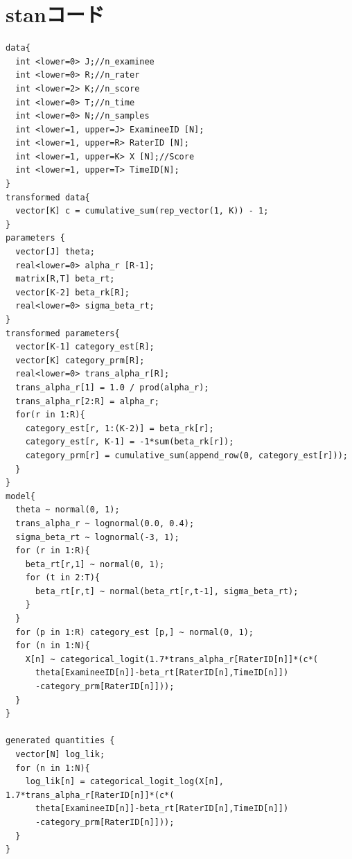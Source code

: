 \documentclass[a4paper,11pt,oneside,openany]{jsbook}
\begin{document}
\chapter{stanコード}
\begin{lstlisting}[basicstyle=\ttfamily\footnotesize, frame=single]
data{
  int <lower=0> J;//n_examinee
  int <lower=0> R;//n_rater
  int <lower=2> K;//n_score
  int <lower=0> T;//n_time
  int <lower=0> N;//n_samples
  int <lower=1, upper=J> ExamineeID [N];
  int <lower=1, upper=R> RaterID [N];
  int <lower=1, upper=K> X [N];//Score
  int <lower=1, upper=T> TimeID[N];
}
transformed data{
  vector[K] c = cumulative_sum(rep_vector(1, K)) - 1;
}
parameters {
  vector[J] theta;
  real<lower=0> alpha_r [R-1];
  matrix[R,T] beta_rt;
  vector[K-2] beta_rk[R];
  real<lower=0> sigma_beta_rt;
}
transformed parameters{
  vector[K-1] category_est[R];
  vector[K] category_prm[R];
  real<lower=0> trans_alpha_r[R];
  trans_alpha_r[1] = 1.0 / prod(alpha_r);
  trans_alpha_r[2:R] = alpha_r;
  for(r in 1:R){
    category_est[r, 1:(K-2)] = beta_rk[r];
    category_est[r, K-1] = -1*sum(beta_rk[r]);
    category_prm[r] = cumulative_sum(append_row(0, category_est[r]));
  }
}
model{
  theta ~ normal(0, 1);
  trans_alpha_r ~ lognormal(0.0, 0.4);
  sigma_beta_rt ~ lognormal(-3, 1);
  for (r in 1:R){
    beta_rt[r,1] ~ normal(0, 1);
    for (t in 2:T){
      beta_rt[r,t] ~ normal(beta_rt[r,t-1], sigma_beta_rt);
    }
  }
  for (p in 1:R) category_est [p,] ~ normal(0, 1);
  for (n in 1:N){
    X[n] ~ categorical_logit(1.7*trans_alpha_r[RaterID[n]]*(c*(
      theta[ExamineeID[n]]-beta_rt[RaterID[n],TimeID[n]])
      -category_prm[RaterID[n]]));
  }
}

generated quantities {
  vector[N] log_lik;
  for (n in 1:N){
    log_lik[n] = categorical_logit_log(X[n], 1.7*trans_alpha_r[RaterID[n]]*(c*(
      theta[ExamineeID[n]]-beta_rt[RaterID[n],TimeID[n]])
      -category_prm[RaterID[n]]));
  }
}

\end{lstlisting}
\newpage



\end{document}
